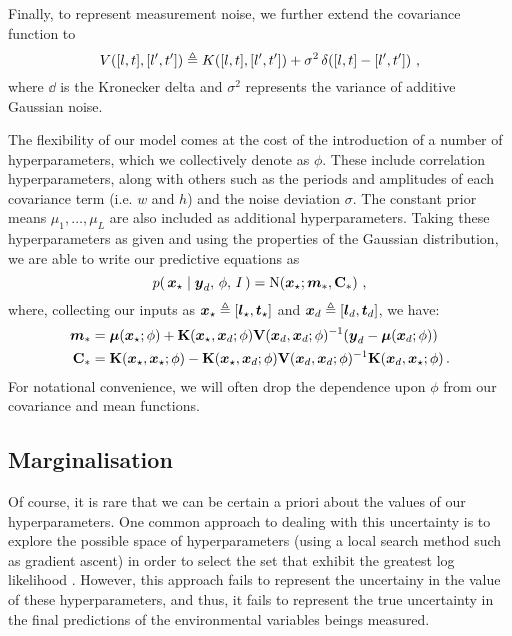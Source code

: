 \documentclass{acmtrans2m}
\begin{document}
Finally, to represent measurement noise, we further extend the covariance function to
\begin{equation*}
V([l,t],[l',t'])\triangleq K([l,t],[l',t'])+ \sigma^2\,\delta\!\left([l,t]-[l',t']\right)\,,
\end{equation*}
where $\dd{}{}$ is the Kronecker delta and $\sigma^2$ represents the variance of additive Gaussian noise.

The flexibility of our model comes at the cost of the introduction of a number of hyperparameters, which we collectively denote as $\phi$. These include correlation hyperparameters, along with others such as the periods and amplitudes of each covariance term (i.e. $w$ and $h$) and the noise deviation $\sigma$. The constant prior means $\mu_1,\ldots,\mu_L$ are also included as additional hyperparameters. Taking these hyperparameters as given and using the properties of the Gaussian distribution, we are able to write our predictive equations as
\begin{equation} \label{eq:GPMeanVar}
p\!\left(\,\boldsymbol{x}_\star\mid\boldsymbol{y}_d,\,\phi,\,I\,\right)=\text{N}\!\left(\boldsymbol{x}_\star;\boldsymbol{m}_\ast,\mathbf{C}_\ast\right)\,,
\end{equation}
where, collecting our inputs as $\boldsymbol{x}_\star\triangleq[\boldsymbol{l}_\star,\boldsymbol{t}_\star]$ and $\boldsymbol{x}_d\triangleq[\boldsymbol{l}_d,\boldsymbol{t}_d]$, we have:
\begin{align} 
\boldsymbol{m}_\ast&=\boldsymbol{\mu}(\boldsymbol{x}_\star;\phi)+\mathbf{K}(\boldsymbol{x}_\star,\boldsymbol{x}_d;\phi)\mathbf{V}(\boldsymbol{x}_d,\boldsymbol{x}_d;\phi)^{-1}(\boldsymbol{y}_d-\boldsymbol{\mu}(\boldsymbol{x}_d;\phi))\label{eq:GPMean}\\
\mathbf{C}_\ast&=\mathbf{K}(\boldsymbol{x}_\star,\boldsymbol{x}_\star;\phi)-\mathbf{K}(\boldsymbol{x}_\star,\boldsymbol{x}_d;\phi)\mathbf{V}(\boldsymbol{x}_d,\boldsymbol{x}_d;\phi)^{-1}\mathbf{K}(\boldsymbol{x}_d,\boldsymbol{x}_\star;\phi)\label{eq:GPVar}\,.
\end{align}
For notational convenience, we will often drop the dependence upon $\phi$ from our covariance and mean functions.

\subsection{Marginalisation}

\noindent Of course, it is rare that we can be certain a priori about the values of our hyperparameters. One common approach to dealing with this uncertainty is to explore the possible space of hyperparameters (using a local search method such as gradient ascent) in order to select the set that exhibit the greatest log likelihood \cite{GPsBook}. However, this approach fails to represent the uncertainy in the value of these hyperparameters, and thus, it fails to represent the true uncertainty in the final predictions of the environmental variables beings measured.
\end{document}
